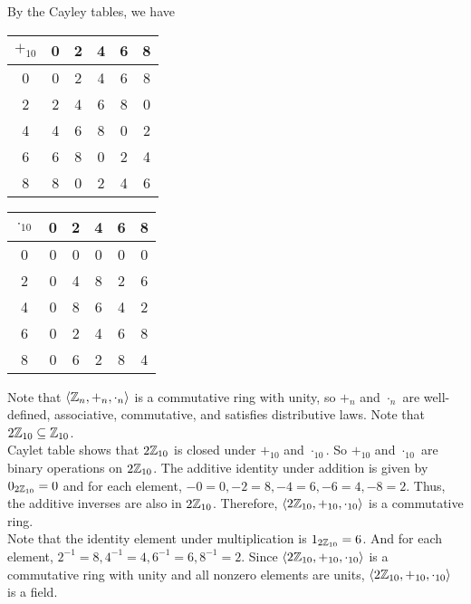 \begin{solution} By the Cayley tables, we have

\begin{center}
    \begin{multicols}{2}
        \begin{tabular}{c | c c c c c}
             $+_{10}$ & 0 & 2 & 4 & 6 & 8  \\
             \hline
             0 & 0 & 2 & 4 & 6 & 8 \\
             2 & 2 & 4 & 6 & 8 & 0 \\
             4 & 4 & 6 & 8 & 0 & 2 \\
             6 & 6 & 8 & 0 & 2 & 4 \\
             8 & 8 & 0 & 2 & 4 & 6 \\
        \end{tabular}
        
        \columnbreak
        
        \begin{tabular}{c | c c c c c}
             ${\cdot}_{10}$ & 0 & 2 & 4 & 6 & 8  \\
             \hline
             0 & 0 & 0 & 0 & 0 & 0 \\
             2 & 0 & 4 & 8 & 2 & 6 \\
             4 & 0 & 8 & 6 & 4 & 2 \\
             6 & 0 & 2 & 4 & 6 & 8 \\
             8 & 0 & 6 & 2 & 8 & 4 \\
        \end{tabular}
    \end{multicols}
\end{center}

Note that $\langle \mathbb{Z}_n, +_n, \cdot_n \rangle$ is a commutative ring with unity, so $+_n$ and $\cdot_n$ are well-defined, associative, commutative, and satisfies distributive laws. Note that $2\mathbb{Z}_{10} \subseteq \mathbb{Z}_{10}$. \\

Caylet table shows that $2\mathbb{Z}_{10}$ is closed under $+_{10}$ and $\cdot_{10}$. So $+_{10}$ and $\cdot_{10}$ are binary operations on $2\mathbb{Z}_{10}$. The additive identity under addition is given by $0_{2\mathbb{Z}_{10}} = 0$ and for each element, $-0 = 0, -2 = 8, -4 = 6, -6 = 4, -8 = 2$. Thus, the additive inverses are also in $2\mathbb{Z}_{10}$. Therefore, $\langle 2\mathbb{Z}_{10}, +_{10}, \cdot_{10} \rangle$ is a commutative ring. \\

Note that the identity element under multiplication is $1_{2\mathbb{Z}_{10}} = 6$. And for each element, $2^{-1} = 8, 4^{-1} = 4, 6^{-1} = 6, 8^{-1} = 2$. Since $\langle 2\mathbb{Z}_{10}, +_{10}, \cdot_{10} \rangle$ is a commutative ring with unity and all nonzero elements are units, $\langle 2\mathbb{Z}_{10}, +_{10}, \cdot_{10} \rangle$ is a field. \qedsymbol
\end{solution}

